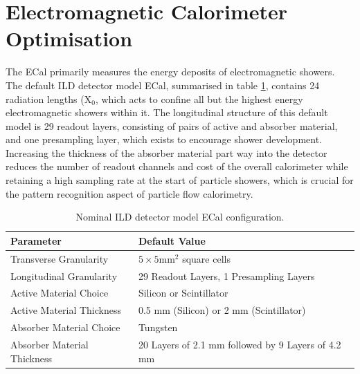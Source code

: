 
\section{Electromagnetic Calorimeter Optimisation}
\label{sec:ecal}
The ECal primarily measures the energy deposits of electromagnetic showers.  The default ILD detector model ECal, summarised in table \ref{table:defaultildecal}, contains 24 radiation lengths ($\text{X}_{0}$, which acts to confine all but the highest energy electromagnetic showers within it.  The longitudinal structure of this default model is 29 readout layers, consisting of pairs of active and absorber material, and one presampling layer, which exists to encourage shower development.  Increasing the thickness of the absorber material part way into the detector reduces the number of readout channels and cost of the overall calorimeter while retaining a high sampling rate at the start of particle showers, which is crucial for the pattern recognition aspect of particle flow calorimetry.  

\begin{table}[h!]
\centering
\begin{tabular}{ l l}
\hline
Parameter & Default Value \\
\hline
Transverse Granularity & $5 \times 5 \text{mm}^{2}$ square cells \\
Longitudinal Granularity & 29 Readout Layers, 1 Presampling Layers \\
Active Material Choice & Silicon or Scintillator  \\
Active Material Thickness & 0.5 mm (Silicon) or 2 mm (Scintillator)  \\
Absorber Material Choice & Tungsten \\
Absorber Material Thickness & 20 Layers of 2.1 mm followed by 9 Layers of 4.2 mm \\
\hline
\end{tabular}
\caption[Nominal ILD detector model ECal configuration.]{Nominal ILD detector model ECal configuration.}
\label{table:defaultildecal}
\end{table}


